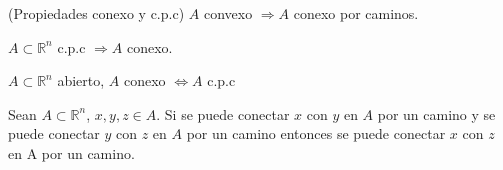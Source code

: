 \begin{prop}(Propiedades conexo y c.p.c)
$A$ convexo $\Rightarrow A$ conexo por caminos.
\end{prop}

\begin{theo}
$A \subset \mathbb{R}^n$ c.p.c $\Rightarrow A$ conexo.
\end{theo}

\begin{theo}
$A \subset \mathbb{R}^n$ abierto, $A$ conexo $ \Leftrightarrow A$ c.p.c
\end{theo}

\begin{prop}
Sean $A \subset \mathbb{R}^n$, $x,y,z \in A$. Si se puede conectar $x$ con $y$ en $A$ por un camino y se puede conectar $y$ con $z$ en $A$ por un camino entonces se puede conectar $x$ con $z$ en A por un camino.
\end{prop}
